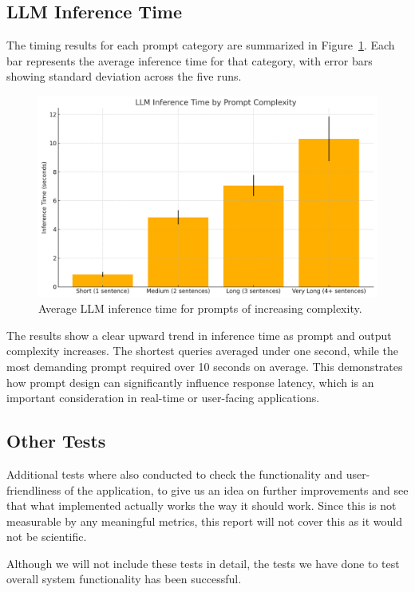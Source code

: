 \documentclass[twocolumn]{article}
\begin{document}
\subsection{LLM Inference Time}
The timing results for each prompt category are summarized in Figure~\ref{fig:inference-times}. Each bar represents the average inference time for that category, with error bars showing standard deviation across the five runs.
\begin{figure}[H]
    \centering
    \includegraphics[width=\linewidth]{imgs/output.png} 
    \caption{Average LLM inference time for prompts of increasing complexity.}
    \label{fig:inference-times}
\end{figure}
The results show a clear upward trend in inference time as prompt and output complexity increases. The shortest queries averaged under one second, while the most demanding prompt required over 10 seconds on average. This demonstrates how prompt design can significantly influence response latency, which is an important consideration in real-time or user-facing applications.

\subsection{Other Tests}
Additional tests where also conducted to check the functionality and user-friendliness of the application, to give us an idea on further improvements and see that what implemented actually works the way it should work. Since this is not measurable by any meaningful metrics, this report will not cover this as it would not be scientific.

Although we will not include these tests in detail, the tests we have done to test overall system functionality has been successful.
\end{document}
